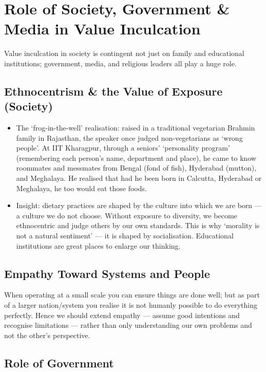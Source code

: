 \section{Role of Society, Government \& Media in Value Inculcation}

Value inculcation in society is contingent not just on family and educational institutions; government, media, and religious leaders all play a huge role.

\subsection{Ethnocentrism \& the Value of Exposure (Society)}

\begin{ExampleBox}
\begin{itemize}
\item The `frog-in-the-well' realisation: raised in a traditional vegetarian Brahmin family in Rajasthan, the speaker once judged non-vegetarians as `wrong people'. At IIT Kharagpur, through a seniors' `personality program' (remembering each person's name, department and place), he came to know roommates and messmates from Bengal (fond of fish), Hyderabad (mutton), and Meghalaya. He realised that had he been born in Calcutta, Hyderabad or Meghalaya, he too would eat those foods.
\item Insight: dietary practices are shaped by the culture into which we are born --- a culture we do not choose. Without exposure to diversity, we become ethnocentric and judge others by our own standards. This is why `morality is not a natural sentiment' --- it is shaped by socialisation. Educational institutions are great places to enlarge our thinking.
\end{itemize}
\end{ExampleBox}

\subsection{Empathy Toward Systems and People}

When operating at a small scale you can ensure things are done well; but as part of a larger nation/system you realise it is not humanly possible to do everything perfectly. Hence we should extend empathy --- assume good intentions and recognise limitations --- rather than only understanding our own problems and not the other's perspective.

\subsection{Role of Government}

